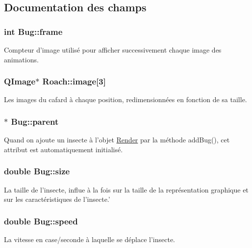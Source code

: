 \subsection{Documentation des champs}
\hypertarget{classBug_ad7e3597cf049f1051be94fcaf2fd3598}{
\subsubsection[{frame}]{\setlength{\rightskip}{0pt plus 5cm}int {\bf Bug::frame}}}
\label{classBug_ad7e3597cf049f1051be94fcaf2fd3598}
Compteur d'image utilisé pour afficher successivement chaque image des animations. \hypertarget{classRoach_afe6b72503197eb2bacafda9df317b96f}{
\subsubsection[{image}]{\setlength{\rightskip}{0pt plus 5cm}QImage$\ast$ {\bf Roach::image}\mbox{[}3\mbox{]}}}
\label{classRoach_afe6b72503197eb2bacafda9df317b96f}
Les images du cafard à chaque position, redimensionnées en fonction de sa taille. \hypertarget{classBug_a7a93aae4e4b7a215c94ff85d0bd6e26d}{
\subsubsection[{parent}]{$\ast$ {\bf Bug::parent}}}
\label{classBug_a7a93aae4e4b7a215c94ff85d0bd6e26d}
Quand on ajoute un insecte à l'objet \hyperlink{classRender}{Render} par la méthode addBug(), cet attribut est automatiquement initialisé. \hypertarget{classBug_a27a0f0b84d15525e409955509e6e3c42}{
\subsubsection[{size}]{\setlength{\rightskip}{0pt plus 5cm}double {\bf Bug::size}}}
\label{classBug_a27a0f0b84d15525e409955509e6e3c42}
La taille de l'insecte, influe à la fois sur la taille de la représentation graphique et sur les caractéristiques de l'insecte.' \hypertarget{classBug_a13b95fbf23748ea853b01bfd0b0e7fc8}{
\subsubsection[{speed}]{\setlength{\rightskip}{0pt plus 5cm}double {\bf Bug::speed}}}
\label{classBug_a13b95fbf23748ea853b01bfd0b0e7fc8}
La vitesse en case/seconde à laquelle se déplace l'insecte. 

